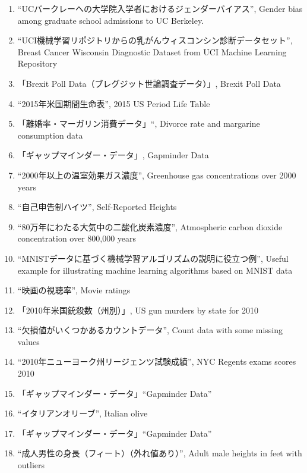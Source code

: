 \documentclass[
]{bxjsbook}
\providecommand{\tightlist}{%
  \setlength{\itemsep}{0pt}\setlength{\parskip}{0pt}}
\theoremstyle{definition}
\theoremstyle{definition}
\theoremstyle{definition}
\theoremstyle{definition}
\theoremstyle{remark}
\begin{document}
\begin{enumerate}
\def\labelenumi{\arabic{enumi}.}
\tightlist
\item
  ``UCバークレーへの大学院入学者におけるジェンダーバイアス'', Gender bias among graduate school admissions to UC Berkeley.\\
\item
  ``UCI機械学習リポジトリからの乳がんウィスコンシン診断データセット'', Breast Cancer Wisconsin Diagnostic Dataset from UCI Machine Learning Repository\\
\item
  「Brexit Poll Data（ブレグジット世論調査データ）」, Brexit Poll Data
\item
  ``2015年米国期間生命表'', 2015 US Period Life Table
\item
  「離婚率・マーガリン消費データ」``, Divorce rate and margarine consumption data\\
\item
  「ギャップマインダー・データ」, Gapminder Data\\
\item
  ``2000年以上の温室効果ガス濃度'', Greenhouse gas concentrations over 2000 years\\
\item
  ``自己申告制ハイツ'', Self-Reported Heights
\item
  ``80万年にわたる大気中の二酸化炭素濃度'', Atmospheric carbon dioxide concentration over 800,000 years\\
\item
  ``MNISTデータに基づく機械学習アルゴリズムの説明に役立つ例'', Useful example for illustrating machine learning algorithms based on MNIST data\\
\item
  ``映画の視聴率'', Movie ratings
\item
  「2010年米国銃殺数（州別）」, US gun murders by state for 2010
\item
  ``欠損値がいくつかあるカウントデータ'', Count data with some missing values
\item
  ``2010年ニューヨーク州リージェンツ試験成績'', NYC Regents exams scores 2010
\item
  「ギャップマインダー・データ」``Gapminder Data''
\item
  ``イタリアンオリーブ'', Italian olive
\item
  「ギャップマインダー・データ」``Gapminder Data''\\
\item
  ``成人男性の身長（フィート）（外れ値あり）'', Adult male heights in feet with outliers\\

\end{enumerate}
\end{document}
